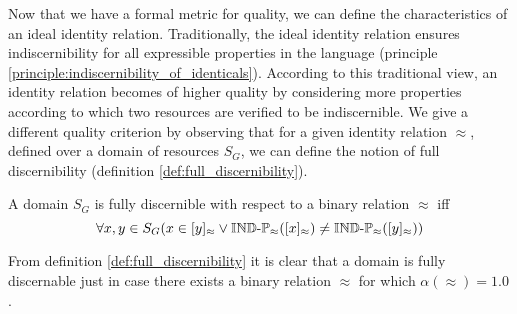 \noindent Now that we have a formal metric for quality,
  we can define the characteristics of an ideal identity relation.
Traditionally, the ideal identity relation ensures indiscernibility
  for all expressible properties in the language
  (principle \ref{principle:indiscernibility_of_identicals}).
According to this traditional view, an identity relation becomes of
  higher quality by considering more properties
  according to which two resources are verified to be indiscernible.
We give a different quality criterion by observing that
  for a given identity relation $\approx$,
  defined over a domain of resources $S_G$,
  we can define the notion of full discernibility
  (definition \ref{def:full_discernibility}).

\begin{definition}
\label{def:full_discernibility}
A domain $S_G$ is fully discernible with respect to
  a binary relation $\approx$ iff
\[
  \forall x,y \in S_G (
      x \in [y]_{\approx}
    \lor
      \operatorname{{\mathbb{IND}-\mathbb{P}}}_{\approx}([x]_{\approx}) \neq \operatorname{{\mathbb{IND}-\mathbb{P}}}_{\approx}([y]_{\approx})
    )
\]
\end{definition}

\noindent From definition \ref{def:full_discernibility}
  it is clear that a domain is fully discernable just in case
  there exists a binary relation $\approx$
  for which \mbox{$\alpha(\approx) = 1.0$}.

